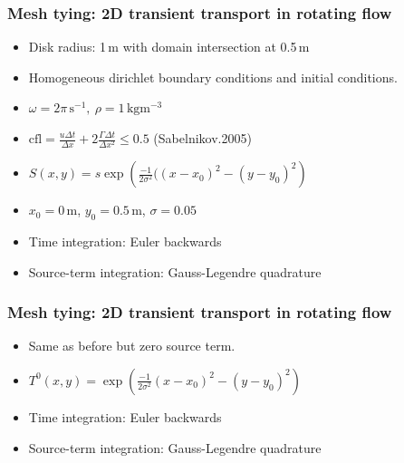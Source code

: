 \documentclass[10pt,xcolor=dvipsnames]{beamer}
\begin{document}
\begin{frame}[t]
  \frametitle{Mesh tying: 2D transient transport in rotating flow}
  \begin{snugshade}
  \begin{itemize}
   \item Disk radius: 1\,m with domain intersection at 0.5\,m
   \item Homogeneous dirichlet boundary conditions and initial conditions.
   \item $\omega = 2\pi\,\mathrm{s^{-1}},\ \rho = 1\,\mathrm{kg m^{-3}}$
   \item $\text{cfl} = \frac{u\Delta t}{\Delta x} + 2\frac{\Gamma \Delta t}{\Delta x ^2}\leq 0.5 $ (Sabelnikov.2005)
   \item $S(x,y) = s\exp\left(\frac{-1}{2\sigma^2}((x-x_0)^2 - (y-y_0)^2\right)$
   \item $x_0 = 0\,\mathrm{m}$, $y_0 = 0.5\,\mathrm{m}$, $\sigma = 0.05$
  \end{itemize}
  \end{snugshade}
    \begin{snugshade}
  \begin{itemize}
   \item Time integration: Euler backwards
   \item Source-term integration: Gauss-Legendre quadrature
  \end{itemize}
  \end{snugshade}



\end{frame}

\begin{frame}[t]
  \frametitle{Mesh tying: 2D transient transport in rotating flow}
\begin{snugshade}
  \begin{itemize}
   \item Same as before but zero source term.
   \item $T^0(x,y) = \exp\left(\frac{-1}{2\sigma^2}(x-x_0)^2 - (y-y_0)^2\right)$

  \end{itemize}
\end{snugshade}
    \begin{snugshade}
  \begin{itemize}
   \item Time integration: Euler backwards
   \item Source-term integration: Gauss-Legendre quadrature
  \end{itemize}
  \end{snugshade}

\end{frame}
\end{document}
